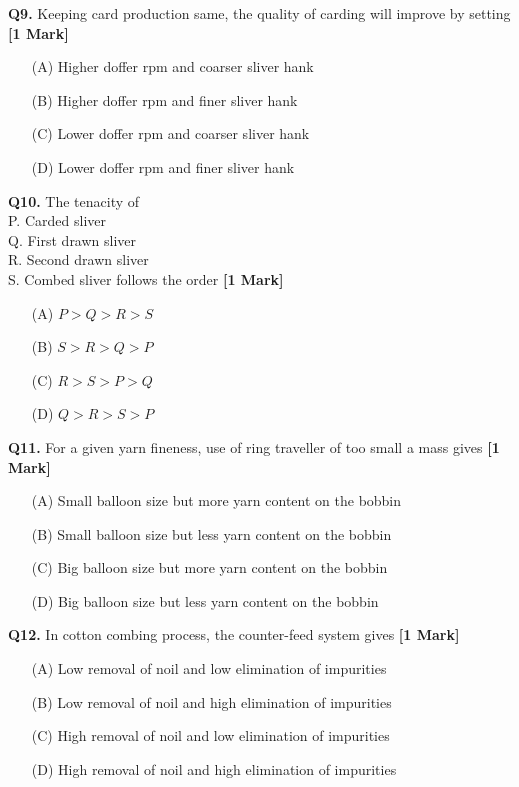 \documentclass[11pt]{article}
\newcommand{\questiona}[2]{
    \noindent\textbf{Q#2.} #1 \hfill \textbf{[1 Mark]}
}
\begin{document}
\questiona{Keeping card production same, the quality of carding will improve by setting}{9}
\begin{enumerate}
    \item[(A)] Higher doffer rpm and coarser sliver hank  
    \item[(B)] Higher doffer rpm and finer sliver hank  
    \item[(C)] Lower doffer rpm and coarser sliver hank  
    \item[(D)] Lower doffer rpm and finer sliver hank  
\end{enumerate}
\vspace{0.5cm}

\questiona{The tenacity of\\
P. Carded sliver  \\
Q. First drawn sliver  \\
R. Second drawn sliver  \\
S. Combed sliver  
follows the order  }{10}
\begin{enumerate}
    \item[(A)] \( P > Q > R > S \)  
    \item[(B)] \( S > R > Q > P \)  
    \item[(C)] \( R > S > P > Q \)  
    \item[(D)] \( Q > R > S > P \)
\end{enumerate}
\vspace{0.5cm}

\questiona{For a given yarn fineness, use of ring traveller of too small a mass gives}{11}
\begin{enumerate}
    \item[(A)] Small balloon size but more yarn content on the bobbin  
    \item[(B)] Small balloon size but less yarn content on the bobbin  
    \item[(C)] Big balloon size but more yarn content on the bobbin  
    \item[(D)] Big balloon size but less yarn content on the bobbin  
\end{enumerate}
\vspace{0.5cm}

\questiona{In cotton combing process, the counter-feed system gives}{12}
\begin{enumerate}
    \item[(A)] Low removal of noil and low elimination of impurities  
    \item[(B)] Low removal of noil and high elimination of impurities  
    \item[(C)] High removal of noil and low elimination of impurities  
    \item[(D)] High removal of noil and high elimination of impurities  
\end{enumerate}
\vspace{0.5cm}
\end{document}
